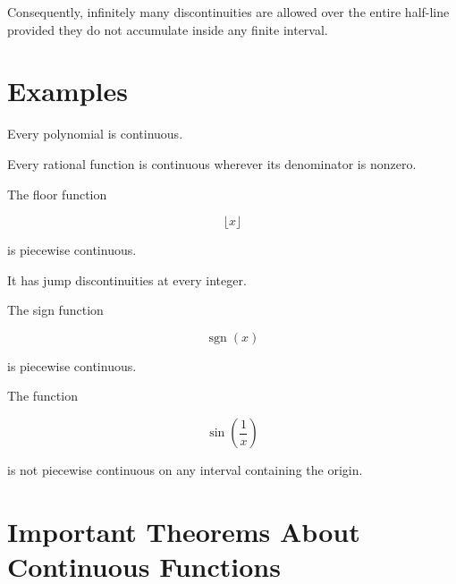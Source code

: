 \documentclass{essay}
\begin{document}
Consequently, infinitely many discontinuities are allowed over the entire
half-line provided they do not accumulate inside any finite interval.


\section{Examples}

\begin{example}

Every polynomial is continuous.

\end{example}

\begin{example}

Every rational function is continuous wherever its denominator is nonzero.

\end{example}

\begin{example}

The floor function

\[
\lfloor x\rfloor
\]

is piecewise continuous.

It has jump discontinuities at every integer.

\end{example}

\begin{example}

The sign function

\[
\operatorname{sgn}(x)
\]

is piecewise continuous.

\end{example}

\begin{example}

The function

\[
\sin\left(\frac1x\right)
\]

is not piecewise continuous on any interval containing the origin.

\end{example}


\section{Important Theorems About Continuous Functions}
\end{document}
